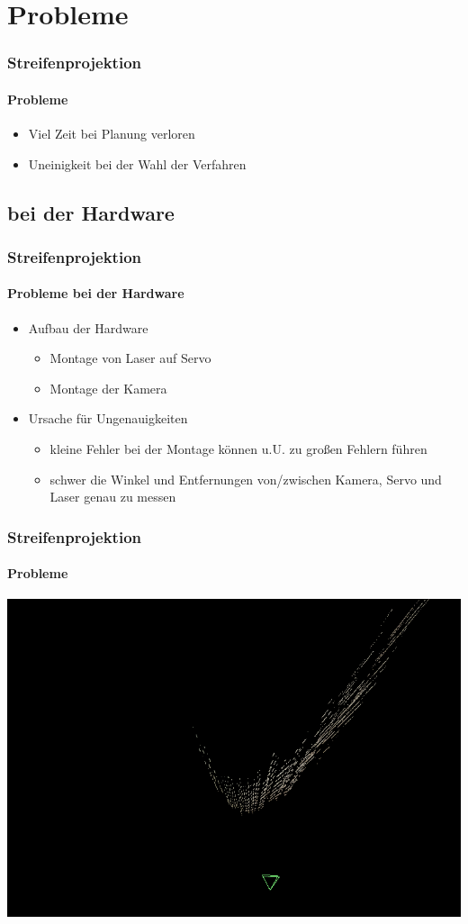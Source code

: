 \documentclass[xcolor=dvipsnames]{beamer}
\begin{document}
\section{Probleme}
\begin{frame}
	\frametitle{Streifenprojektion}
	\framesubtitle{Probleme}

	\begin{itemize}
		\item Viel Zeit bei Planung verloren
		\item Uneinigkeit bei der Wahl der Verfahren
	\end{itemize}

\end{frame}

\subsection{bei der Hardware}
\begin{frame}
	\frametitle{Streifenprojektion}
	\framesubtitle{Probleme bei der Hardware}

	\begin{itemize}
		\item Aufbau der Hardware
		\begin{itemize}
			\item Montage von Laser auf Servo
			\item Montage der Kamera
		\end{itemize}
		\item Ursache für Ungenauigkeiten
		\begin{itemize}
			\item kleine Fehler bei der Montage können u.U. zu großen Fehlern führen
			\item schwer die Winkel und Entfernungen von/zwischen Kamera, Servo und Laser genau zu messen 
		\end{itemize}
	\end{itemize}

\end{frame}

\begin{frame}
	\frametitle{Streifenprojektion}
	\framesubtitle{Probleme}

	\includegraphics[width=\linewidth]{includes/krumm.png}

\end{frame}
\end{document}
